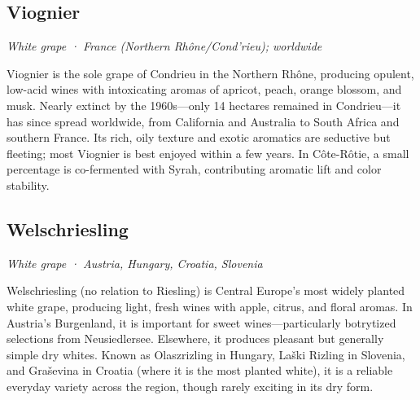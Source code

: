 \subsection*{Viognier}
\textit{White grape · France (Northern Rhône/Cond’rieu); worldwide}\par\smallskip

Viognier is the sole grape of Condrieu in the Northern Rhône, producing opulent, low-acid wines with intoxicating aromas of apricot, peach, orange blossom, and musk. Nearly extinct by the 1960s—only 14 hectares remained in Condrieu—it has since spread worldwide, from California and Australia to South Africa and southern France. Its rich, oily texture and exotic aromatics are seductive but fleeting; most Viognier is best enjoyed within a few years. In Côte-Rôtie, a small percentage is co-fermented with Syrah, contributing aromatic lift and color stability.

\subsection*{Welschriesling}
\textit{White grape · Austria, Hungary, Croatia, Slovenia}\par\smallskip

Welschriesling (no relation to Riesling) is Central Europe’s most widely planted white grape, producing light, fresh wines with apple, citrus, and floral aromas. In Austria’s Burgenland, it is important for sweet wines—particularly botrytized selections from Neusiedlersee. Elsewhere, it produces pleasant but generally simple dry whites. Known as Olaszrizling in Hungary, Laški Rizling in Slovenia, and Graševina in Croatia (where it is the most planted white), it is a reliable everyday variety across the region, though rarely exciting in its dry form.
